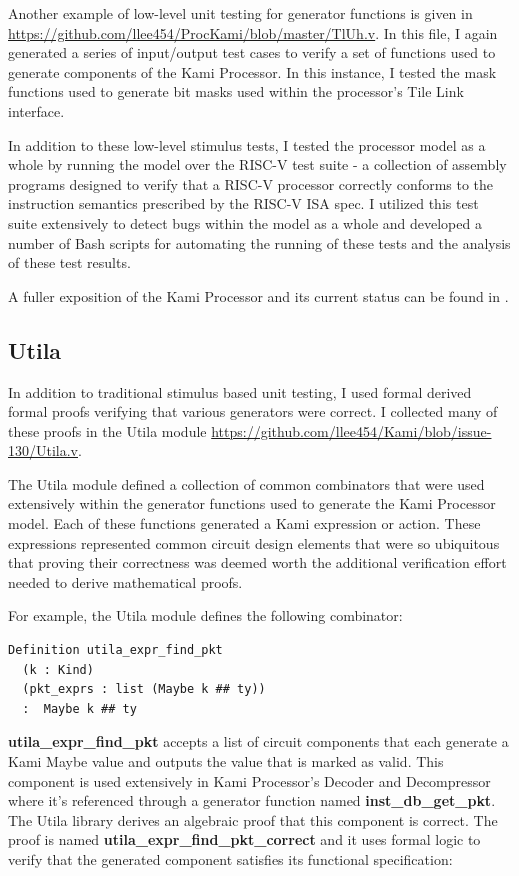 \documentclass[10pt,a4paper]{article}
\begin{document}
Another example of low-level unit testing for generator functions is given in \url{https://github.com/llee454/ProcKami/blob/master/TlUh.v}. In this file, I again generated a series of input/output test cases to verify a set of functions used to generate components of the Kami Processor. In this instance, I tested the mask functions used to generate bit masks used within the processor’s Tile Link interface. 

In addition to these low-level stimulus tests, I tested the processor model as a whole by running the model over the RISC-V test suite - a collection of assembly programs designed to verify that a RISC-V processor correctly conforms to the instruction semantics prescribed by the RISC-V ISA spec. I utilized this test suite extensively to detect bugs within the model as a whole and developed a number of Bash scripts for automating the running of these tests and the analysis of these test results.

A fuller exposition of the Kami Processor and its current status can be found in \cite{kami-proc}.

\subsection{Utila}

In addition to traditional stimulus based unit testing, I used formal derived formal proofs verifying that various generators were correct. I collected many of these proofs in the Utila module \url{https://github.com/llee454/Kami/blob/issue-130/Utila.v}.

The Utila module defined a collection of common combinators that were used extensively within the generator functions used to generate the Kami Processor model. Each of these functions generated a Kami expression or action. These expressions represented common circuit design elements that were so ubiquitous that proving their correctness was deemed worth the additional verification effort needed to derive mathematical proofs.

For example, the Utila module defines the following combinator:
\begin{verbatim}
Definition utila_expr_find_pkt
  (k : Kind)
  (pkt_exprs : list (Maybe k ## ty))
  :  Maybe k ## ty
\end{verbatim}

\textbf{utila\_expr\_find\_pkt} accepts a list of circuit components that each generate a Kami Maybe value and outputs the value that is marked as valid. This component is used extensively in Kami Processor’s Decoder and Decompressor where it’s referenced through a generator function named \textbf{inst\_db\_get\_pkt}. The Utila library derives an algebraic proof that this component is correct. The proof is named \textbf{utila\_expr\_find\_pkt\_correct} and it uses formal logic to verify that the generated component satisfies its functional specification:
\end{document}
